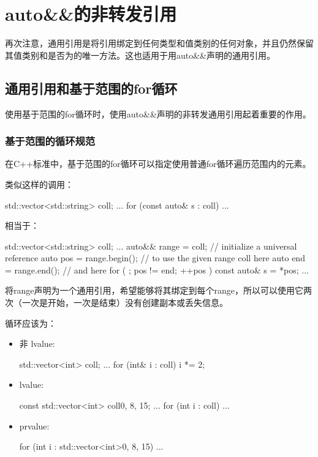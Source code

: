 \section{auto\&\&的非转发引用}
再次注意，通用引用是将引用绑定到任何类型和值类别的任何对象，并且仍然保留其值类别和是否为的唯一方法。这也适用于用auto\&\&声明的通用引用。

\subsection{通用引用和基于范围的for循环}

使用基于范围的for循环时，使用auto\&\&声明的非转发通用引用起着重要的作用。

\subsubsection{基于范围的循环规范}

在C++标准中，基于范围的for循环可以指定使用普通for循环遍历范围内的元素。

类似这样的调用：

\begin{cppcode}
std::vector<std::string> coll;
...
for (const auto& s : coll) {
	...
}
\end{cppcode}

相当于：

\begin{cppcode}
std::vector<std::string> coll;
...
auto&& range = coll; // initialize a universal reference
auto pos = range.begin(); // to use the given range coll here
auto end = range.end(); // and here
for ( ; pos != end; ++pos ) {
	const auto& s = *pos;
	...
}
\end{cppcode}

将range声明为一个通用引用，希望能够将其绑定到每个range，所以可以使用它两次（一次是开始，一次是结束）没有创建副本或丢失信息。

循环应该为：

\begin{itemize}
\item 非 lvalue:
\begin{cppcode}
std::vector<int> coll;
...
for (int& i : coll) {
	i *= 2;
}
\end{cppcode}
\item {} lvalue:
\begin{cppcode}
const std::vector<int> coll{0, 8, 15};
...
for (int i : coll) {
	...
}
\end{cppcode}
\item prvalue:
\begin{cppcode}
for (int i : std::vector<int>{0, 8, 15}) {
	...
}
\end{cppcode}
\end{itemize}

